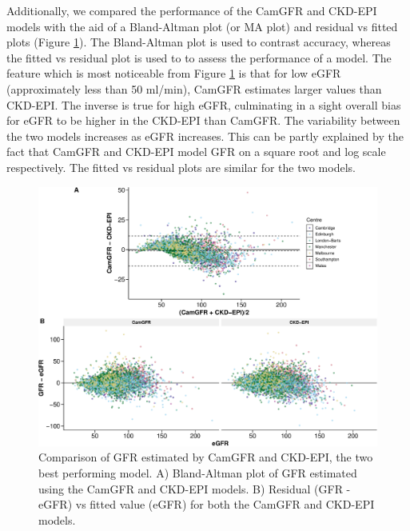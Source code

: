 \documentclass[11pt,]{article}
\begin{document}
Additionally, we compared the performance of the CamGFR and CKD-EPI
models with the aid of a Bland-Altman plot (or MA plot) and residual vs
fitted plots (Figure \ref{fig:CKD_CamGFR_plot}). The Bland-Altman plot
is used to contrast accuracy, whereas the fitted vs residual plot is
used to to assess the performance of a model. The feature which is most
noticeable from Figure \ref{fig:CKD_CamGFR_plot} is that for low eGFR
(approximately less than 50 ml/min), CamGFR estimates larger values than
CKD-EPI. The inverse is true for high eGFR, culminating in a sight
overall bias for eGFR to be higher in the CKD-EPI than CamGFR. The
variability between the two models increases as eGFR increases. This can
be partly explained by the fact that CamGFR and CKD-EPI model GFR on a
square root and log scale respectively. The fitted vs residual plots are
similar for the two models.

\begin{figure}
\centering
\includegraphics{1_Validation_nonIDMS_resubmission_files/figure-latex/CKD_CamGFR_GFR_plot-1.pdf}
\caption{\label{fig:CKD_CamGFR_plot}Comparison of GFR estimated by
CamGFR and CKD-EPI, the two best performing model. A) Bland-Altman plot
of GFR estimated using the CamGFR and CKD-EPI models. B) Residual (GFR -
eGFR) vs fitted value (eGFR) for both the CamGFR and CKD-EPI models.}
\end{figure}
\end{document}
